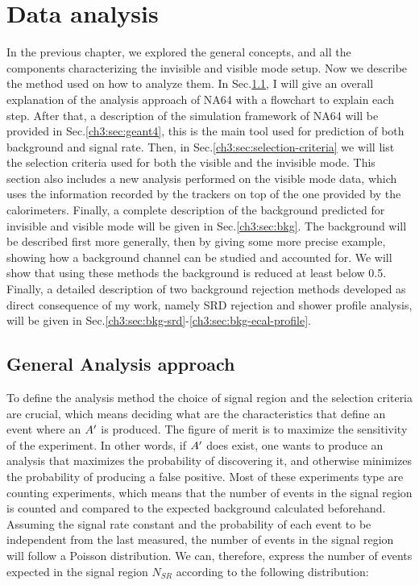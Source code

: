 
\newcommand{\pdirthree}{chapters/plots/chapter3}

\chapter{Data analysis} %
\label{chapter3} %


In the previous chapter, we explored the general concepts, and all the components characterizing the invisible and visible mode setup. Now we describe the method used on how to analyze them. In Sec.\ref{ch3:sec:analysis-approach}, I will give an overall explanation of the analysis approach of NA64 with a flowchart to explain each step. After that, a description of the simulation framework of NA64 will be provided in Sec.\ref{ch3:sec:geant4}, this is the main tool used for prediction of both background and signal rate.
Then, in Sec.\ref{ch3:sec:selection-criteria} we will list the selection criteria used for both the visible and the invisible mode. This section also includes a new analysis performed on the visible mode data, which uses the information recorded by the trackers on top of the one provided by the calorimeters.
Finally, a complete description of the background predicted for invisible and visible mode will be given in Sec.\ref{ch3:sec:bkg}. The background will be described first more generally, then by giving some more precise example, showing how a background channel can be studied and accounted for. We will show that using these methods the background is reduced at least below 0.5. Finally, a detailed description of two background rejection methods developed as direct consequence of my work, namely SRD rejection and shower profile analysis, will be given in Sec.\ref{ch3:sec:bkg-srd}-\ref{ch3:sec:bkg-ecal-profile}.


\section{General Analysis approach}
\label{ch3:sec:analysis-approach}

To define the analysis method the choice of signal region and the selection criteria are crucial, which means deciding what are the characteristics that define an event where an $A'$ is produced. The figure of merit is to maximize the sensitivity of the experiment. In other words, if $A'$ does exist, one wants to produce an analysis that maximizes the probability of discovering it, and otherwise minimizes the probability of producing a false positive. Most of these experiments type are counting experiments, which means that the number of events in the signal region is counted and compared to the expected background calculated beforehand. Assuming the signal rate constant and the probability of each event to be independent from the last measured, the number of events in the signal region will follow a Poisson distribution. We can, therefore, express the number of events expected in the signal region $N_{SR}$ according to the following distribution:


